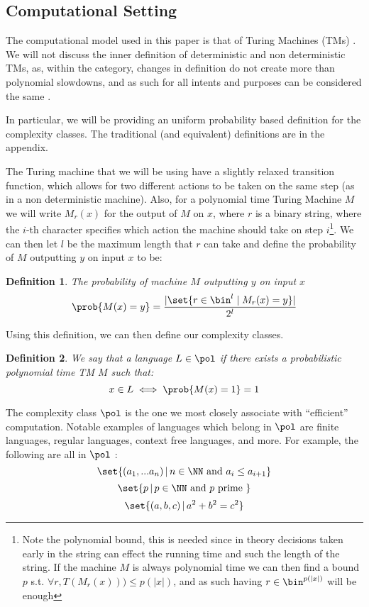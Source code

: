 \documentclass{article}
\newtheorem{definition}{Definition}
\begin{document}
\subsection{Computational Setting}
The computational model used in this paper is that of Turing Machines (TMs) \cite{turingComputableNumbersApplication1937}. We will not discuss the inner definition of deterministic and non deterministic TMs, as, within the category, changes in definition do not create more than polynomial slowdowns, and as such for all intents and purposes can be considered the same \cite{aroraComputationalComplexityModern2009}.

In particular, we will be providing an uniform probability based definition for the complexity classes. The traditional (and equivalent) definitions are in the appendix.

The Turing machine that we will be using have a slightly relaxed transition function, which allows for two different actions to be taken on the same step (as in a non deterministic machine). Also, for a polynomial time Turing Machine $M$ we will write $M_r(x)$ for the output of $M$ on $x$, where $r$ is a binary string, where the $i$-th character specifies which action the machine should take on step $i$\footnote{Note the polynomial bound, this is needed since in theory decisions taken early in the string can effect the running time and such the length of the string. If the machine $M$ is always polynomial time we can then find a bound $p$ s.t. $\forall r, T(M_r(x))) \leq p(|x|) $, and as such having $r \in \bin^{p(|x|)}$ will be enough}. We can then let $l$ be the maximum length that $r$ can take and define the probability of $M$ outputting $y$ on input $x$ to be:

\begin{definition} The probability of machine $M$ outputting $y$ on input $x$
    \[ \prob{M(x) = y} = \frac{|\set{r \in \bin^{l} \mid M_r(x) = y }|}{2^{l}}\]
\end{definition}

Using this definition, we can then define our complexity classes.

\begin{definition}
    We say that a language $L \in \pol$ if there exists a probabilistic polynomial time TM $M$ such that:
    \[x \in L \iff \prob{M(x) = 1} = 1\]
\end{definition}

The complexity class $\pol$ is the one we most closely associate with \enquote{efficient} computation. Notable examples of languages which belong in $\pol$ are finite languages, regular languages, context free languages, and more. For example, the following are all in $\pol$ :
\[ \set{(a_1, ... a_n) \, | \, n \in \NN \text{ and } a_i \leq a_{i+1} }\]
\[ \set{ p \,|\, p \in \NN \text{ and } p \text{ prime } }\]
\[ \set{ (a, b, c) \, | \, a^2 + b^2 = c^2 } \]
\end{document}
